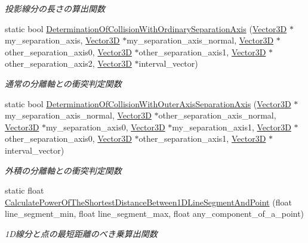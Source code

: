 \begin{DoxyCompactItemize}
\begin{DoxyCompactList}\small\item\em 投影線分の長さの算出関数 \end{DoxyCompactList}\item 
static bool \mbox{\hyperlink{class_collision_calculation_adc04a190b8bf8696880ea33d8ef01b09}{Determination\+Of\+Collision\+With\+Ordinary\+Separation\+Axis}} (\mbox{\hyperlink{class_vector3_d}{Vector3D}} $\ast$my\+\_\+separation\+\_\+axis, \mbox{\hyperlink{class_vector3_d}{Vector3D}} $\ast$my\+\_\+separation\+\_\+axis\+\_\+normal, \mbox{\hyperlink{class_vector3_d}{Vector3D}} $\ast$other\+\_\+separation\+\_\+axis0, \mbox{\hyperlink{class_vector3_d}{Vector3D}} $\ast$other\+\_\+separation\+\_\+axis1, \mbox{\hyperlink{class_vector3_d}{Vector3D}} $\ast$other\+\_\+separation\+\_\+axis2, \mbox{\hyperlink{class_vector3_d}{Vector3D}} $\ast$interval\+\_\+vector)
\begin{DoxyCompactList}\small\item\em 通常の分離軸との衝突判定関数 \end{DoxyCompactList}\item 
static bool \mbox{\hyperlink{class_collision_calculation_a7ad238e8d35646bf4034879204d94533}{Determination\+Of\+Collision\+With\+Outer\+Axis\+Separation\+Axis}} (\mbox{\hyperlink{class_vector3_d}{Vector3D}} $\ast$my\+\_\+separation\+\_\+axis\+\_\+normal, \mbox{\hyperlink{class_vector3_d}{Vector3D}} $\ast$other\+\_\+separation\+\_\+axis\+\_\+normal, \mbox{\hyperlink{class_vector3_d}{Vector3D}} $\ast$my\+\_\+separation\+\_\+axis0, \mbox{\hyperlink{class_vector3_d}{Vector3D}} $\ast$my\+\_\+separation\+\_\+axis1, \mbox{\hyperlink{class_vector3_d}{Vector3D}} $\ast$other\+\_\+separation\+\_\+axis0, \mbox{\hyperlink{class_vector3_d}{Vector3D}} $\ast$other\+\_\+separation\+\_\+axis1, \mbox{\hyperlink{class_vector3_d}{Vector3D}} $\ast$interval\+\_\+vector)
\begin{DoxyCompactList}\small\item\em 外積の分離軸との衝突判定関数 \end{DoxyCompactList}\item 
static float \mbox{\hyperlink{class_collision_calculation_a2b210c0e981995e209a86d2f521608d1}{Calculate\+Power\+Of\+The\+Shortest\+Distance\+Between1\+D\+Line\+Segment\+And\+Point}} (float line\+\_\+segment\+\_\+min, float line\+\_\+segment\+\_\+max, float any\+\_\+component\+\_\+of\+\_\+a\+\_\+point)
\begin{DoxyCompactList}\small\item\em 1\+D線分と点の最短距離のべき乗算出関数 \end{DoxyCompactList}\end{DoxyCompactItemize}


